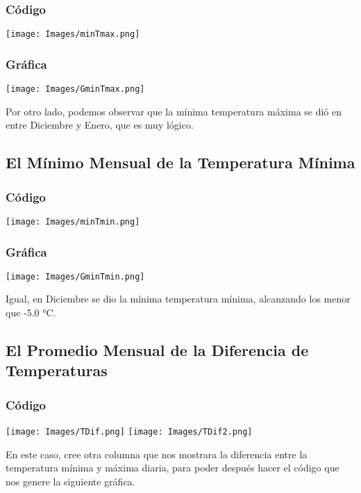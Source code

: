 \documentclass{article}
\begin{document}
\subsubsection{Código}
\begin{center}
    \texttt{[image: Images/minTmax.png]}
\end{center}
\subsubsection{Gráfica}
\begin{center}
    \texttt{[image: Images/GminTmax.png]}
\end{center}
Por otro lado, podemos observar que la mínima temperatura máxima se dió en entre Diciembre y Enero, que es muy lógico.

\subsection{El Mínimo Mensual de la Temperatura Mínima}

\subsubsection{Código}
\begin{center}
    \texttt{[image: Images/minTmin.png]}
\end{center}

\subsubsection{Gráfica}
\begin{center}
    \texttt{[image: Images/GminTmin.png]}
\end{center}

Igual, en Diciembre se dio la mínima temperatura mínima, alcanzando los menor que -5.0 °C.

\subsection{El Promedio Mensual de la Diferencia de Temperaturas}
\subsubsection{Código}
\begin{center}
    \texttt{[image: Images/TDif.png]}
    \texttt{[image: Images/TDif2.png]}
\end{center}
En este caso, cree otra columna que nos mostrara la diferencia entre la temperatura mínima y máxima diaria, para poder después hacer el código que nos genere la siguiente gráfica.
\end{document}
